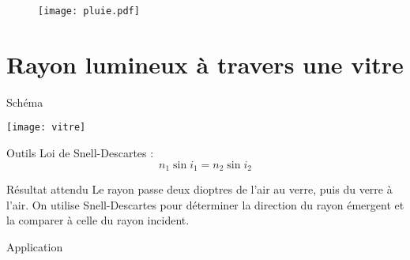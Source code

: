 \documentclass[a4paper, 12pt, final, garamond]{book}
\begin{document}
\begin{figure}[h]
    \centering
    \texttt{[image: pluie.pdf]}
    \label{fig:pluie_plain}
\end{figure}

\section{Rayon lumineux à travers une vitre}

\begin{tcbraster}[raster columns=11, raster equal height=rows]
    \begin{tcolorbox}[blankest, raster multicolumn=5, space to=\myspace]
        \begin{tcbraster}[raster columns=1]
            \begin{NCdefi}[raster multicolumn=1]{Schéma}
                \begin{center}
                    \texttt{[image: vitre]}
                \end{center}
            \end{NCdefi}
            \begin{NCrapp}[add to natural height=\myspace]{Outils}
                Loi de Snell-Descartes :
                \[n_1\sin i_1 = n_2\sin i_2\]
            \end{NCrapp}
        \end{tcbraster}
    \end{tcolorbox}
    \begin{tcolorbox}[blankest, raster multicolumn=6, space to=\myspace]
        \begin{tcbraster}[raster columns=1]
            \begin{NCprop}[raster multicolumn=6]{Résultat attendu}
                Le rayon passe deux dioptres de l'air au verre, puis
                du verre à l'air. On utilise Snell-Descartes pour déterminer la
                direction du rayon émergent et la comparer à celle du rayon
                incident.
            \end{NCprop}
            \begin{NCexem}[sidebyside, righthand width=1.5cm,
                add to natural height=\myspace]{Application}
\end{NCexem}
\end{tcbraster}
\end{tcolorbox}
\end{tcbraster}
\end{document}
